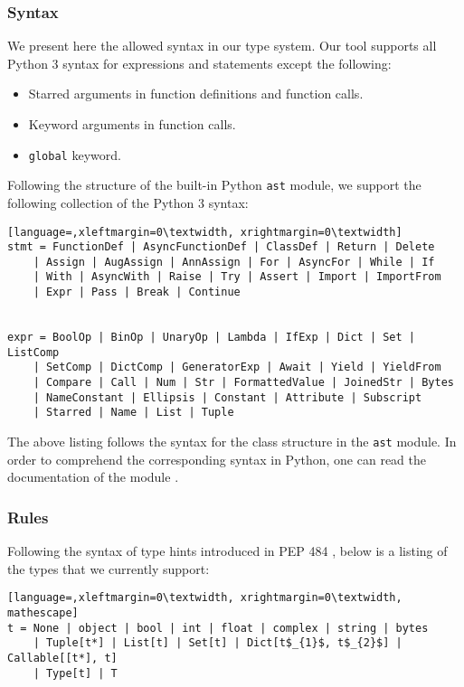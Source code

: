 \subsubsection{Syntax}
We present here the allowed syntax in our type system. Our tool supports all Python 3 syntax for expressions and statements except the following:
\begin{itemize}
	\item Starred arguments in function definitions and function calls.
	\item Keyword arguments in function calls.
	\item \lstinline|global| keyword.
\end{itemize}

Following the structure of the built-in Python \lstinline|ast| module, we support the following collection of the Python 3 syntax:

\begin{lstlisting}[language=,xleftmargin=0\textwidth, xrightmargin=0\textwidth]
stmt = FunctionDef | AsyncFunctionDef | ClassDef | Return | Delete
	| Assign | AugAssign | AnnAssign | For | AsyncFor | While | If
	| With | AsyncWith | Raise | Try | Assert | Import | ImportFrom
	| Expr | Pass | Break | Continue


expr = BoolOp | BinOp | UnaryOp | Lambda | IfExp | Dict | Set | ListComp
	| SetComp | DictComp | GeneratorExp | Await | Yield | YieldFrom
	| Compare | Call | Num | Str | FormattedValue | JoinedStr | Bytes
	| NameConstant | Ellipsis | Constant | Attribute | Subscript
	| Starred | Name | List | Tuple

\end{lstlisting}
The above listing follows the syntax for the class structure in the \lstinline|ast| module. In order to comprehend the corresponding syntax in Python, one can read the documentation of the module \cite{ast_documentation}.


\subsubsection{Rules}
Following the syntax of type hints introduced in PEP 484 \cite{484}, below is a listing of the types that we currently support:

\begin{lstlisting}[language=,xleftmargin=0\textwidth, xrightmargin=0\textwidth, mathescape]
t = None | object | bool | int | float | complex | string | bytes
	| Tuple[t*] | List[t] | Set[t] | Dict[t$_{1}$, t$_{2}$] | Callable[[t*], t]
	| Type[t] | T
	
\end{lstlisting}

